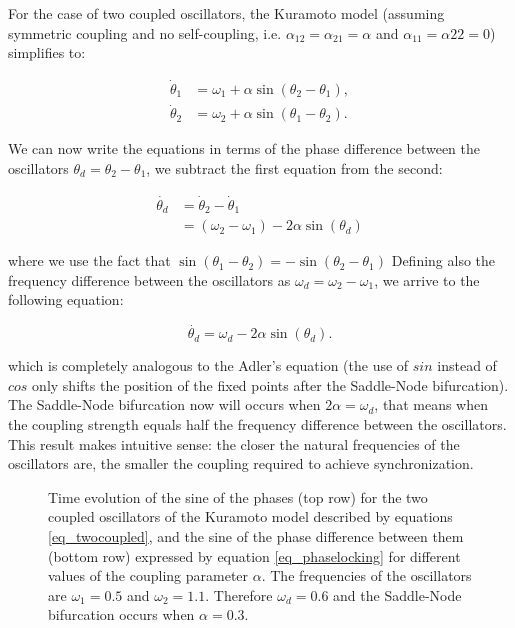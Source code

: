 \documentclass{article}
\begin{document}
For the case of two coupled oscillators, the Kuramoto model (assuming symmetric coupling and no self-coupling, i.e. $\alpha_{12}=\alpha_{21}=\alpha$ and $\alpha_{11}=\alpha{22}=0$) simplifies to:

\begin{subequations} \label{eq_twocoupled}
\begin{align} 
    \dot{\theta}_1 &= \omega_1 + \alpha \sin(\theta_2 - \theta_1), \\
    \dot{\theta}_2 &= \omega_2 + \alpha \sin(\theta_1 - \theta_2).
\end{align}
\end{subequations}

We can now write the equations in terms of the phase difference between the oscillators $\theta_d = \theta_2 - \theta_1$, we subtract the first equation from the second:

\begin{subequations} \label{eq_twocoupledb}
\begin{align} 
    \dot{\theta_d} &= \dot{\theta}_2 - \dot{\theta}_1 \\
    &= (\omega_2 - \omega_1) - 2\alpha \sin(\theta_d)
\end{align}
\end{subequations}

where we use the fact that $\sin(\theta_1 - \theta_2) = - \sin(\theta_2 - \theta_1)$
Defining also the frequency difference between the oscillators as $\omega_d = \omega_2 - \omega_1$, we arrive to the following equation:

\begin{equation} \label{eq_phaselocking}
    \dot{\theta_d} = \omega_d - 2\alpha \sin(\theta_d).
\end{equation}

which is completely analogous to the Adler's equation (the use of $sin$ instead of $cos$ only shifts the position of the fixed points after the Saddle-Node bifurcation). The Saddle-Node bifurcation now will occurs when $2\alpha = \omega_d$, that means when the coupling strength equals half the frequency difference between the oscillators. 
This result makes intuitive sense: the closer the natural frequencies of the oscillators are, the smaller the coupling required to achieve synchronization.


\begin{figure} [h]
    \centerline{}
    \caption{Time evolution of the sine of the phases (top row) for the  two coupled oscillators of the Kuramoto model described by equations \ref{eq_twocoupled}, and the sine of the phase difference between them (bottom row) expressed by equation \ref{eq_phaselocking} for different values of the coupling parameter $\alpha$. The frequencies of the oscillators are $\omega_1=0.5$ and $\omega_2=1.1$. Therefore $\omega_d=0.6$ and the Saddle-Node bifurcation occurs when $\alpha=0.3$.
    }
    \label{fig_twocoupled}
\end{figure}
\end{document}
